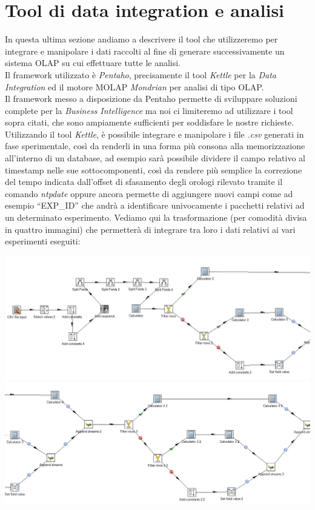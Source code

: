 	\section{Tool di data integration e analisi}
	In questa ultima sezione andiamo a descrivere il tool che utilizzeremo per integrare e manipolare i dati raccolti al fine di generare successivamente un sistema OLAP su cui effettuare tutte le analisi.\\
	Il framework utilizzato è \textit{Pentaho}, precisamente il tool \textit{Kettle} per la \textit{Data Integration} ed il motore MOLAP \textit{Mondrian} per analisi di tipo OLAP.\\
	Il framework messo a disposizione da Pentaho permette di sviluppare soluzioni complete per la \textit{Business Intelligence} ma noi ci limiteremo ad utilizzare i tool sopra citati, che sono ampiamente sufficienti per soddisfare le nostre richieste.\\
	Utilizzando il tool \textit{Kettle}, è possibile integrare e manipolare i file \textit{.csv} generati in fase sperimentale, così da renderli in una forma più consona alla memorizzazione all'interno di un database, ad esempio sarà possibile dividere il campo relativo al timestamp nelle sue sottocomponenti, così da rendere più semplice la correzione del tempo indicata dall'offset di sfasamento degli orologi rilevato tramite il comando \textit{ntpdate} oppure ancora permette di aggiungere nuovi campi come ad esempio ``EXP\_ID'' che andrà a identificare univocamente i pacchetti relativi ad un determinato esperimento.
	Vediamo qui la trasformazione (per comodità divisa in quattro immagini) che permetterà di integrare tra loro i dati relativi ai vari esperimenti eseguiti:
	
	\includegraphics[scale=0.4]{figure/kettle1.jpg}\\
	
	\includegraphics[scale=0.4]{figure/kettle2.jpg}\\
	
